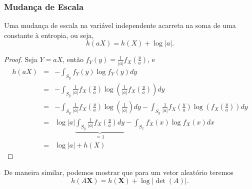 \begin{frame}[allowframebreaks]
  \frametitle{Mudança de Escala}

  \begin{theorem}
    Uma mudança de escala na variável independente acarreta na soma de uma constante à entropia, ou seja,
    \begin{equation}
      h(aX) = h(X) + \log \vert a \vert .
    \end{equation}
  \end{theorem}

  \framebreak
  \begin{proof}
  Seja $Y = aX$, então $f_Y (y) = \frac{1}{\vert a \vert} f_X \left( \frac{y}{a} \right)$, e
    \begin{eqnarray}
    h(aX) &=& - \int_{S_y} f_Y (y) \log f_Y (y) dy \nonumber \\
	&=& - \int_{S_y} \frac{1}{\vert a \vert} f_X \left( \frac{y}{a} \right) \log \left( \frac{1}{\vert a \vert} f_X \left( \frac{y}{a} \right) \right) dy \nonumber \\
	&=& - \int_{S_y} \frac{1}{\vert a \vert} f_X \left( \frac{y}{a} \right) \log \left( \frac{1}{\vert a \vert} \right) dy - \int_{S_y} \frac{1}{\vert a \vert} f_X \left( \frac{y}{a} \right) \log \left( f_X \left( \frac{y}{a} \right) \right) dy \nonumber \\
	&=& \log \vert a \vert \underbrace{ \int_{S_y} \frac{1}{\vert a \vert} f_X \left( \frac{y}{a} \right) dy }_{ = 1} - \int_{S_x} f_X (x) \log f_X (x) dx \nonumber \\
	&=& \log \vert a \vert + h(X)
    \end{eqnarray}
  \end{proof}

  \framebreak

  \begin{corollary}
  De maneira similar, podemos mostrar que para um vetor aleatório teremos
  \begin{equation}
  h(A \mathbf{X}) = h(\mathbf{X}) + \log \vert \det (A) \vert .
  \end{equation} 
  \end{corollary}
\end{frame}


